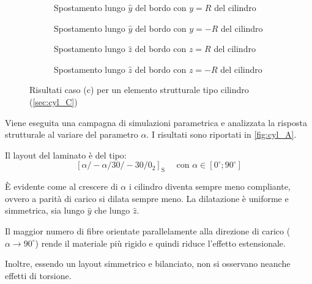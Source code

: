 \documentclass[a4paper,num-refs]{oup-contemporary}
\begin{document}
\begin{figure}[bt!]
			\centering
	\begin{subfigure}[t]{0.23\textwidth}
		\centering
		\caption{Spostamento lungo $\hat y$ del bordo con $y=R$ del cilindro}
		
	\end{subfigure}
	\hfill
	\begin{subfigure}[t]{0.23\textwidth}
		\centering
		
		\caption{Spostamento lungo $\hat y$ del bordo con $y=-R$ del cilindro}
		
	\end{subfigure}
	\hfill
	\begin{subfigure}[t]{0.23\textwidth}
		\centering
		\caption{Spostamento lungo $\hat z$ del bordo con $z=R$ del cilindro}
	\end{subfigure}
	\hfill
	\begin{subfigure}[t]{0.23\textwidth}
		\centering
		\caption{Spostamento lungo $\hat z$ del bordo con $z=-R$ del cilindro}
	\end{subfigure}
	\hfill
	\caption{Risultati caso (c) per un elemento strutturale tipo cilindro (\cref{sec:cyl_C})}
	\label{fig:cyl_C}
	
\end{figure}

Viene eseguita una campagna di simulazioni parametrica e analizzata la risposta strutturale al variare del parametro $\alpha$. I risultati sono riportati in \cref{fig:cyl_A}.

Il layout del laminato è del tipo:
\begin{equation}
	\left[\alpha /-\alpha / 30 /-30 / 0_{2}\right]_{\mathrm{S}} \quad \text{ con } \alpha \in \left[0^\circ;90^\circ\right]
\end{equation}


È evidente come al crescere di $\alpha$ i cilindro diventa sempre meno compliante, ovvero a parità di carico si dilata sempre meno. La dilatazione è uniforme e simmetrica, sia lungo $\hat y$ che lungo $\hat z$.

Il maggior numero di fibre orientate parallelamente alla direzione di carico ($\alpha \to 90^\circ$) rende il materiale più rigido e quindi riduce l'effetto estensionale. 

Inoltre, essendo un layout simmetrico e bilanciato, non si osservano neanche effetti di torsione.
\end{document}
